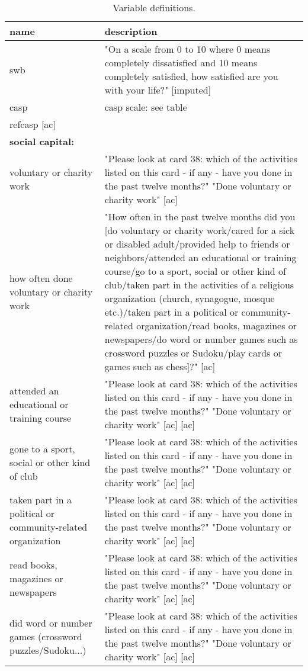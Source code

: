 \begin{table}[H]\centering\footnotesize
 \caption{\label{var_des} Variable definitions.}
\begin{tabular} {p{1.5in}p{4.5in}}   \hline
name & description   \\ \hline
  swb & "On a scale from 0 to 10 where 0 means completely dissatisfied and 10 means completely satisfied, how satisfied are you with your life?" [imputed] \\
  casp & casp scale: see table \\ref{casp} [ac] \\
\hline {\bf social capital:}&\\
  voluntary or charity work & "Please look at card 38: which of the activities listed on this card - if any - have you done in the past twelve months?" "Done voluntary or charity work" [ac] \\
  how often done voluntary or charity work & "How often in the past twelve months did you [do voluntary or charity work/cared for a sick or disabled adult/provided help to friends or neighbors/attended an educational or training course/go to a sport, social or other kind of club/taken part in the activities of a religious organization (church, synagogue, mosque etc.)/taken part in a political or community-related organization/read books, magazines or newspapers/do word or number games such as crossword puzzles or Sudoku/play cards or games such as chess]?" [ac] \\
  attended an educational or training course & "Please look at card 38: which of the activities listed on this card - if any - have you done in the past twelve months?" "Done voluntary or charity work" [ac]  [ac] \\
  gone to a sport, social or other kind of club & "Please look at card 38: which of the activities listed on this card - if any - have you done in the past twelve months?" "Done voluntary or charity work" [ac]  [ac] \\
  taken part in a political or community-related organization & "Please look at card 38: which of the activities listed on this card - if any - have you done in the past twelve months?" "Done voluntary or charity work" [ac]  [ac] \\
  read books, magazines or newspapers & "Please look at card 38: which of the activities listed on this card - if any - have you done in the past twelve months?" "Done voluntary or charity work" [ac]  [ac] \\
  did word or number games (crossword puzzles/Sudoku...) & "Please look at card 38: which of the activities listed on this card - if any - have you done in the past twelve months?" "Done voluntary or charity work" [ac]  [ac] \\

\end{tabular}
\end{table}
